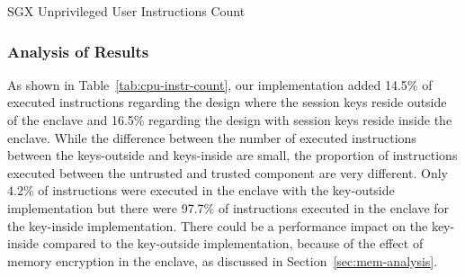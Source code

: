\documentclass[../../../main.tex]{subfiles}
\begin{document}
\begin{table}[H]
  \caption{SGX Unprivileged User Instructions Count}
  \label{tab:sgx-enclu}
\end{table}

\subsubsection*{Analysis of Results}
As shown in Table~\ref{tab:cpu-instr-count}, our implementation added 14.5\% of
executed instructions regarding the design where the session keys reside
outside of the enclave and 16.5\% regarding the design with session keys
reside inside the enclave. While the difference between the number of executed
instructions between the keys-outside and keys-inside are small, the proportion
of instructions executed between the untrusted and trusted component are very
different. Only 4.2\% of instructions were executed in the enclave with the
key-outside implementation but there were 97.7\% of instructions executed in
the enclave for the key-inside implementation. There could be a performance
impact on the key-inside compared to the key-outside implementation, because of
the effect of memory encryption in the enclave, as discussed in
Section~\ref{sec:mem-analysis}.
\end{document}
